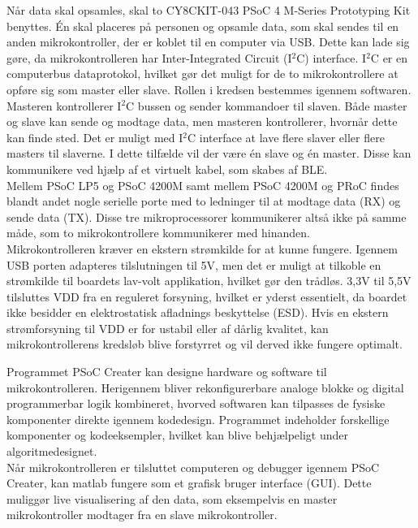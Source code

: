 Når data skal opsamles, skal to CY8CKIT-043 PSoC 4 M-Series Prototyping Kit benyttes. Én skal placeres på personen og opsamle data, som skal sendes til en anden mikrokontroller, der er koblet til en computer via USB. Dette kan lade sig gøre, da mikrokontrolleren har Inter-Integrated Circuit (I$^{2}$C) interface. I$^{2}$C er en computerbus dataprotokol, hvilket gør det muligt for de to mikrokontrollere at opføre sig som master eller slave. Rollen i kredsen bestemmes igennem softwaren. Masteren kontrollerer I$^{2}$C bussen og sender kommandoer til slaven. Både master og slave kan sende og modtage data, men masteren kontrollerer, hvornår dette kan finde sted. Det er muligt med I$^{2}$C interface at lave flere slaver eller flere masters til slaverne. I dette tilfælde vil der være én slave og én master. Disse kan kommunikere ved hjælp af et virtuelt kabel, som skabes af BLE. \citep{Semiconductor2016,Sparkfun2016}\\
Mellem PSoC LP5 og PSoC 4200M samt mellem PSoC 4200M og PRoC findes blandt andet nogle serielle porte med to ledninger til at modtage data (RX) og sende data (TX). Disse tre mikroprocessorer kommunikerer altså ikke på samme måde, som to mikrokontrollere kommunikerer med hinanden. \citep{Semiconductor2016} \\
Mikrokontrolleren kræver en ekstern strømkilde for at kunne fungere. Igennem USB porten adapteres tilslutningen til 5V, men det er muligt at tilkoble en strømkilde til boardets lav-volt applikation, hvilket gør den trådløs. 3,3V til 5,5V tilsluttes VDD fra en reguleret forsyning, hvilket er yderst essentielt, da boardet ikke besidder en elektrostatisk afladnings beskyttelse (ESD). Hvis en ekstern strømforsyning til VDD er for ustabil eller af dårlig kvalitet, kan mikrokontrollerens kredsløb blive forstyrret og vil derved ikke fungere optimalt. \citep{Semiconductor2016}

Programmet PSoC Creater kan designe hardware og software til mikrokontrolleren. Herigennem bliver rekonfigurerbare analoge blokke og digital programmerbar logik kombineret, hvorved softwaren kan tilpasses de fysiske komponenter direkte igennem kodedesign. Programmet indeholder forskellige komponenter og kodeeksempler, hvilket kan blive behjælpeligt under algoritmedesignet. \citep{Semiconductor2016} \\
Når mikrokontrolleren er tilsluttet computeren og debugger igennem PSoC Creater, kan matlab fungere som et grafisk bruger interface (GUI). Dette muliggør live visualisering af den data, som eksempelvis en master mikrokontroller modtager fra en slave mikrokontroller.

